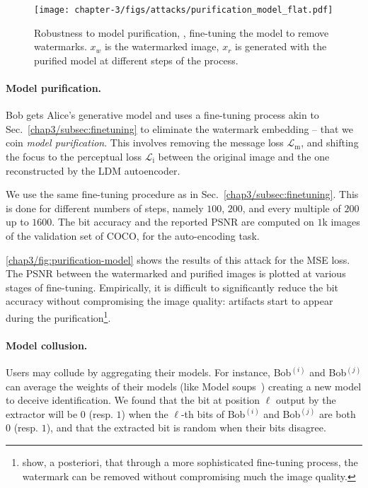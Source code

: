\begin{figure}[b!]
    \centering
    \texttt{[image: chapter-3/figs/attacks/purification\_model\_flat.pdf]}
    \caption{
        Robustness to model purification, \ie, fine-tuning the model to remove watermarks. 
         $x_w$ is the watermarked image, $x_{r}$ is generated with the purified model at different steps of the process.
    }\label{chap3/fig:purification-model}
\end{figure}

\paragraph{Model purification.} 
Bob gets Alice's generative model and uses a fine-tuning process akin to Sec.~\ref{chap3/subsec:finetuning} to eliminate the watermark embedding -- that we coin \emph{model purification}. 
This involves removing the message loss $\mathcal L_\mathrm{m}$, and shifting the focus to the perceptual loss $\mathcal L_\mathrm{i}$ between the original image and the one reconstructed by the LDM autoencoder.

We use the same fine-tuning procedure as in Sec.~\ref{chap3/subsec:finetuning}.
This is done for different numbers of steps, namely $100$, $200$, and every multiple of $200$ up to $1600$.
The bit accuracy and the reported PSNR are computed on $1$k images of the validation set of COCO, for the auto-encoding task.

\autoref{chap3/fig:purification-model} shows the results of this attack for the MSE loss.
The PSNR between the watermarked and purified images is plotted at various stages of fine-tuning.
Empirically, it is difficult to significantly reduce the bit accuracy without compromising the image quality: artifacts start to appear during the purification\footnote{
    \cite{hu2024stable} show, a posteriori, that through a more sophisticated fine-tuning process, the watermark can be removed without compromising much the image quality.
}.


\paragraph{Model collusion.}
Users may collude by aggregating their models.
For instance, Bob$^{(i)}$ and Bob$^{(j)}$ can average the weights of their models (like Model soups~\citep{wortsman2022model}) creating a new model to deceive identification.
We found that the bit at position $\ell$ output by the extractor will be $0$ (resp. $1$) when the $\ell$-th bits of Bob$^{(i)}$ and Bob$^{(j)}$ are both $0$ (resp. $1$), and that the extracted bit is random when their bits disagree.


